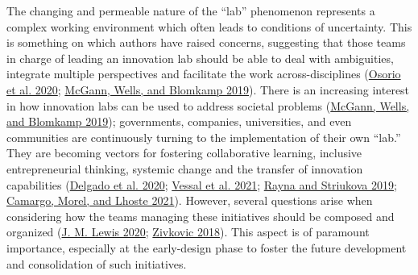 \documentclass[AMA,STIX1COL,APA,STIX2COL]{WileyNJD-v2}
\begin{document}
The changing and permeable nature of the ``lab'' phenomenon represents a
complex working environment which often leads to conditions of
uncertainty. This is something on which authors have raised concerns,
suggesting that those teams in charge of leading an innovation lab
should be able to deal with ambiguities, integrate multiple perspectives
and facilitate the work across-disciplines
(\protect\hyperlink{ref-Osorio2020}{Osorio et al. 2020};
\protect\hyperlink{ref-McGann2019}{McGann, Wells, and Blomkamp 2019}).
There is an increasing interest in how innovation labs can be used to
address societal problems (\protect\hyperlink{ref-McGann2019}{McGann,
Wells, and Blomkamp 2019}); governments, companies, universities, and
even communities are continuously turning to the implementation of their
own ``lab.'' They are becoming vectors for fostering collaborative
learning, inclusive entrepreneurial thinking, systemic change and the
transfer of innovation capabilities
(\protect\hyperlink{ref-Delgado2020}{Delgado et al. 2020};
\protect\hyperlink{ref-RezaeeVessal2021}{Vessal et al. 2021};
\protect\hyperlink{ref-Rayna2019}{Rayna and Striukova 2019};
\protect\hyperlink{ref-Camargo2021}{Camargo, Morel, and Lhoste 2021}).
However, several questions arise when considering how the teams managing
these initiatives should be composed and organized
(\protect\hyperlink{ref-Lewis2020}{J. M. Lewis 2020};
\protect\hyperlink{ref-Zivkovic2018}{Zivkovic 2018}). This aspect is of
paramount importance, especially at the early-design phase to foster the
future development and consolidation of such initiatives.
\end{document}
